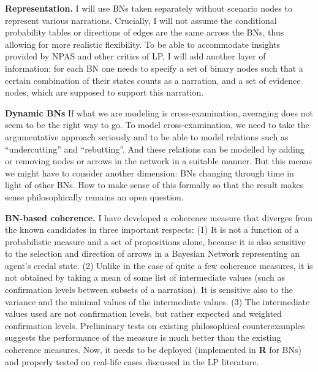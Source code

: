 \documentclass[11pt,dvipsnames,enabledeprecatedfontcommands]{scrartcl}
\begin{document}
\noindent \textbf{Representation.} I will use BNs taken separately
without scenario nodes to represent various narrations. Crucially, I
will not assume the conditional probability tables or directions of
edges are the same across the BNs, thus allowing for more realistic
flexibility. To be able to accommodate insights provided by NPAS and
other critics of LP, I will add another layer of information: for each
BN one needs to specify a set of binary nodes such that a certain
combination of their states counts as a narration, and a set of evidence
nodes, which are supposed to support this narration.

\noindent \textbf{Dynamic BNs} If what we are modeling is
cross-examination, averaging does not seem to be the right way to go. To
model cross-examination, we need to take the argumentative approach
seriously and to be able to model relations such as ``undercutting'' and
``rebutting''. And these relations can be modelled by adding or removing
nodes or arrows in the network in a suitable manner. But this means we
might have to consider another dimension: BNs changing through time in
light of other BNs. How to make sense of this formally so that the
result makes sense philosophically remains an open question.

\noindent \textbf{BN-based coherence.} I have developed a coherence
measure that diverges from the known candidates in three important
respects: (1) It is not a function of a probabilistic measure and a set
of propositions alone, because it is also sensitive to the selection and
direction of arrows in a Bayesian Network representing an agent's credal
state. (2) Unlike in the case of quite a few coherence measures, it is
not obtained by taking a mean of some list of intermediate values (such
as confirmation levels between subsets of a narration). It is sensitive
also to the variance and the minimal values of the intermediate values.
(3) The intermediate values used are not confirmation levels, but rather
expected and weighted confirmation levels. Preliminary tests on existing
philosophical counterexamples suggests the performance of the measure is
much better than the existing coherence measures. Now, it needs to be
deployed (implemented in \textbf{\textsf{R}} for BNs) and properly
tested on real-life cases discussed in the LP literature.
\end{document}
